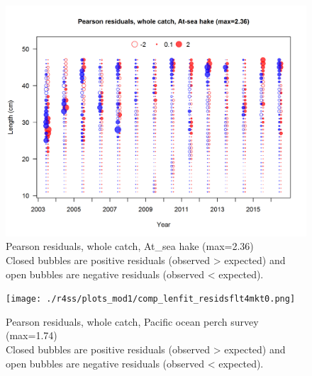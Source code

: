 \documentclass[12pt,]{article}
\begin{document}
\begin{figure}
\centering
\includegraphics{./r4ss/plots_mod1/comp_lenfit_residsflt2mkt0.png}
\caption{Pearson residuals, whole catch, At\_sea hake (max=2.36)\\
Closed bubbles are positive residuals (observed \textgreater{} expected)
and open bubbles are negative residuals (observed \textless{} expected).
\label{fig:ashop_len_pearson}}
\end{figure}

\begin{figure}
\centering
\texttt{[image: ./r4ss/plots\_mod1/comp\_lenfit\_residsflt4mkt0.png]}
\caption{Pearson residuals, whole catch, Pacific ocean perch survey
(max=1.74)\\
Closed bubbles are positive residuals (observed \textgreater{} expected)
and open bubbles are negative residuals (observed \textless{} expected).
\label{fig:pop_len_pearson}}
\end{figure}
\end{document}
